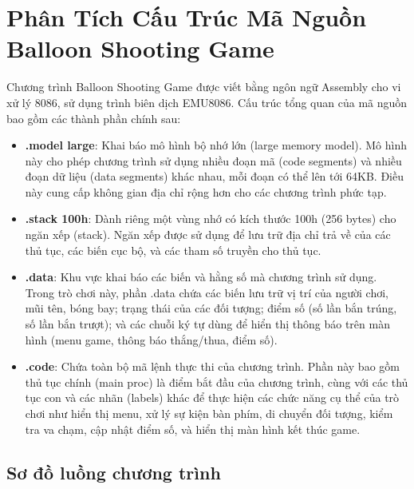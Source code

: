 \documentclass[12pt,a4paper,openany,oneside]{report}
\begin{document}
\chapter{Phân Tích Cấu Trúc Mã Nguồn Balloon Shooting Game}
Chương trình Balloon Shooting Game được viết bằng ngôn ngữ Assembly cho vi xử lý 8086, sử dụng trình biên dịch EMU8086. Cấu trúc tổng quan của mã nguồn bao gồm các thành phần chính sau:
\begin{itemize}
    \item \textbf{.model large}: Khai báo mô hình bộ nhớ lớn (large memory model). Mô hình này cho phép chương trình sử dụng nhiều đoạn mã (code segments) và nhiều đoạn dữ liệu (data segments) khác nhau, mỗi đoạn có thể lên tới 64KB. Điều này cung cấp không gian địa chỉ rộng hơn cho các chương trình phức tạp.
    \item \textbf{.stack 100h}: Dành riêng một vùng nhớ có kích thước 100h (256 bytes) cho ngăn xếp (stack). Ngăn xếp được sử dụng để lưu trữ địa chỉ trả về của các thủ tục, các biến cục bộ, và các tham số truyền cho thủ tục.
    \item \textbf{.data}: Khu vực khai báo các biến và hằng số mà chương trình sử dụng. Trong trò chơi này, phần .data chứa các biến lưu trữ vị trí của người chơi, mũi tên, bóng bay; trạng thái của các đối tượng; điểm số (số lần bắn trúng, số lần bắn trượt); và các chuỗi ký tự dùng để hiển thị thông báo trên màn hình (menu game, thông báo thắng/thua, điểm số).
    \item \textbf{.code}: Chứa toàn bộ mã lệnh thực thi của chương trình. Phần này bao gồm thủ tục chính (main proc) là điểm bắt đầu của chương trình, cùng với các thủ tục con và các nhãn (labels) khác để thực hiện các chức năng cụ thể của trò chơi như hiển thị menu, xử lý sự kiện bàn phím, di chuyển đối tượng, kiểm tra va chạm, cập nhật điểm số, và hiển thị màn hình kết thúc game.
\end{itemize}


\section*{Sơ đồ luồng chương trình}
\end{document}
